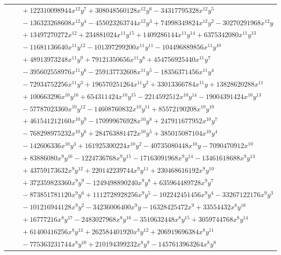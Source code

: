 \documentclass[11pt]{article}
\begin{document}
\begin{longtable}{@{}ll@{}}
 & $\quad +122310098944x^{12}y^{7}+308048560128x^{12}y^{6}-34317795328x^{12}y^{5}$\\
 & $\quad -136323268608x^{12}y^{4}-455023263744x^{12}y^{3}+74998349824x^{12}y^{2}-30270291968x^{12}y$\\
 & $\quad +13497270272x^{12}+234881024x^{11}y^{15}+1409286144x^{11}y^{14}+6375342080x^{11}y^{13}$\\
 & $\quad -11681136640x^{11}y^{12}-101397299200x^{11}y^{11}-104496889856x^{11}y^{10}$\\
 & $\quad +48913973248x^{11}y^{9}+79121350656x^{11}y^{8}+454756925440x^{11}y^{7}$\\
 & $\quad -395602558976x^{11}y^{6}-259137732608x^{11}y^{5}-18356371456x^{11}y^{4}$\\
 & $\quad -72934752256x^{11}y^{3}+196570251264x^{11}y^{2}+33013366784x^{11}y+13828620288x^{11}$\\
 & $\quad +100663296x^{10}y^{16}+654311424x^{10}y^{15}-2214592512x^{10}y^{14}-19004391424x^{10}y^{13}$\\
 & $\quad -57787023360x^{10}y^{12}-14608760832x^{10}y^{11}+85572190208x^{10}y^{10}$\\
 & $\quad +461541212160x^{10}y^{9}-170999676928x^{10}y^{8}+247911677952x^{10}y^{7}$\\
 & $\quad -768298975232x^{10}y^{6}+284763881472x^{10}y^{5}+385015087104x^{10}y^{4}$\\
 & $\quad -142606336x^{10}y^{3}+161925300224x^{10}y^{2}-40735080448x^{10}y-7090470912x^{10}$\\
 & $\quad +83886080x^{9}y^{16}-1224736768x^{9}y^{15}-17163091968x^{9}y^{14}-13461618688x^{9}y^{13}$\\
 & $\quad +43759173632x^{9}y^{12}+220142239744x^{9}y^{11}+230468616192x^{9}y^{10}$\\
 & $\quad +372359823360x^{9}y^{9}-1249498890240x^{9}y^{8}+635964489728x^{9}y^{7}$\\
 & $\quad -873851781120x^{9}y^{6}+1112728928256x^{9}y^{5}-102242451456x^{9}y^{4}-33267122176x^{9}y^{3}$\\
 & $\quad -101216944128x^{9}y^{2}-34236006400x^{9}y-16328425472x^{9}+33554432x^{8}y^{18}$\\
 & $\quad +16777216x^{8}y^{17}-2483027968x^{8}y^{16}-3510632448x^{8}y^{15}+3059744768x^{8}y^{14}$\\
 & $\quad +61400416256x^{8}y^{13}+262584401920x^{8}y^{12}+206919696384x^{8}y^{11}$\\
 & $\quad -775363231744x^{8}y^{10}+210194399232x^{8}y^{9}-1457613963264x^{8}y^{8}$\\

\end{longtable}
\end{document}

